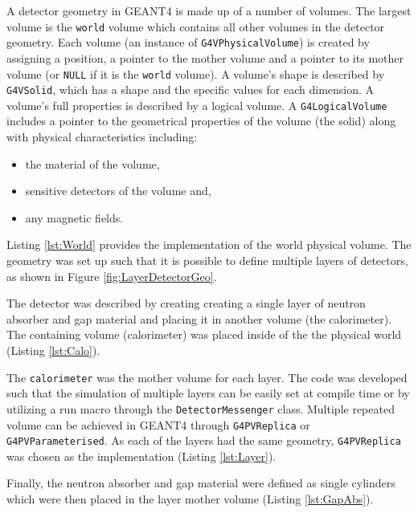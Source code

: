 A detector geometry in GEANT4 is made up of a number of volumes.
The largest volume is the \verb+world+ volume which contains all other volumes in the detector geometry.
Each volume (an instance of \verb+G4VPhysicalVolume+) is created by assigning a position, a pointer to the mother volume and a pointer to its mother volume (or \verb+NULL+ if it is the \verb+world+ volume).
A volume's shape is described by \verb+G4VSolid+, which has a shape and the specific values for each dimension.
A volume's full properties is described by a logical volume.
A \verb+G4LogicalVolume+ includes a pointer to the geometrical properties of the volume (the solid) along with physical characteristics including:
\begin{itemize}
    \item the material of the volume,
    \item sensitive detectors of the volume and,
    \item any magnetic fields.
\end{itemize}
Listing \ref{lst:World} provides the implementation of the world physical volume.
The geometry was set up such that it is possible to define multiple layers of detectors, as shown in Figure \ref{fig:LayerDetectorGeo}.

The detector was described by creating creating a single layer of neutron absorber and gap material and placing it in another volume (the calorimeter).
The containing volume (calorimeter) was placed inside of the the physical world (Listing \ref{lst:Calo}).

The \verb+calorimeter+ was the mother volume for each layer. 
The code was developed such that the simulation of multiple layers can be easily set at compile time or by utilizing a run macro through the \verb+DetectorMessenger+ class.
Multiple repeated volume can be achieved in GEANT4 through \verb+G4PVReplica+ or \verb+G4PVParameterised+.
As each of the layers had the same geometry, \verb+G4PVReplica+ was chosen as the implementation (Listing \ref{lst:Layer}).

Finally, the neutron absorber and gap material were defined as single cylinders which were then placed in the layer mother volume (Listing \ref{lst:GapAbs}).
